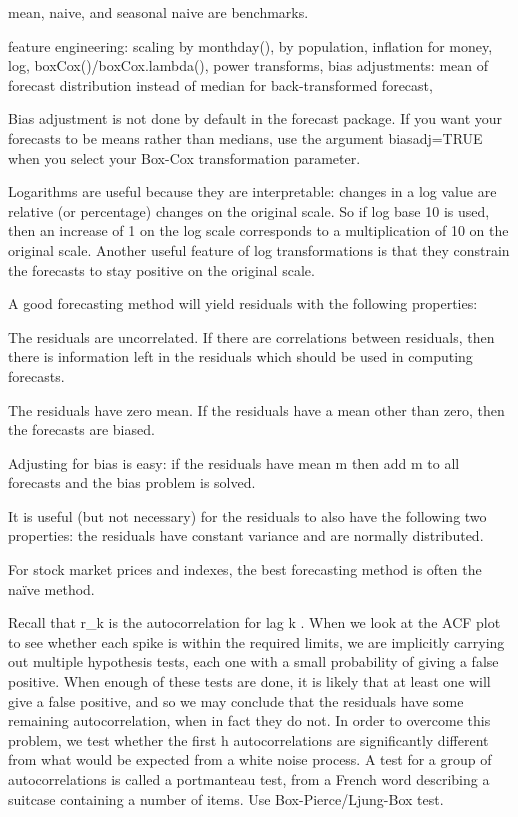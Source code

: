 \documentclass[]{book}
\begin{document}
mean, naive, and seasonal naive are benchmarks.

feature engineering: scaling by monthday(), by population, inflation for
money, log, boxCox()/boxCox.lambda(), power transforms, bias
adjustments: mean of forecast distribution instead of median for
back-transformed forecast,

Bias adjustment is not done by default in the forecast package. If you
want your forecasts to be means rather than medians, use the argument
biasadj=TRUE when you select your Box-Cox transformation parameter.

Logarithms are useful because they are interpretable: changes in a log
value are relative (or percentage) changes on the original scale. So if
log base 10 is used, then an increase of 1 on the log scale corresponds
to a multiplication of 10 on the original scale. Another useful feature
of log transformations is that they constrain the forecasts to stay
positive on the original scale.

A good forecasting method will yield residuals with the following
properties:

The residuals are uncorrelated. If there are correlations between
residuals, then there is information left in the residuals which should
be used in computing forecasts.

The residuals have zero mean. If the residuals have a mean other than
zero, then the forecasts are biased.

Adjusting for bias is easy: if the residuals have mean m then add m to
all forecasts and the bias problem is solved.

It is useful (but not necessary) for the residuals to also have the
following two properties: the residuals have constant variance and are
normally distributed.

For stock market prices and indexes, the best forecasting method is
often the naïve method.

Recall that r\_k is the autocorrelation for lag k . When we look at the
ACF plot to see whether each spike is within the required limits, we are
implicitly carrying out multiple hypothesis tests, each one with a small
probability of giving a false positive. When enough of these tests are
done, it is likely that at least one will give a false positive, and so
we may conclude that the residuals have some remaining autocorrelation,
when in fact they do not. In order to overcome this problem, we test
whether the first h autocorrelations are significantly different from
what would be expected from a white noise process. A test for a group of
autocorrelations is called a portmanteau test, from a French word
describing a suitcase containing a number of items. Use
Box-Pierce/Ljung-Box test.
\end{document}
